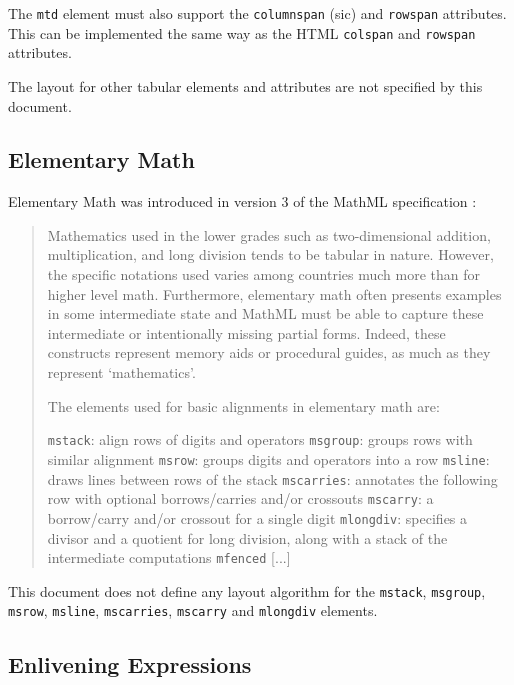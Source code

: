 The {\tt mtd} element must also support the {\tt columnspan} (sic) and
{\tt rowspan} attributes. This can be implemented the same way as
the HTML {\tt colspan} and {\tt rowspan} attributes.

The layout for other tabular elements and attributes are not specified by this
document.

\subsection{Elementary Math}

Elementary Math was introduced in version 3 of the MathML specification
\cite{MathML3}:

\begin{quote}
Mathematics used in the lower grades such as two-dimensional addition,
multiplication, and long division tends to be tabular in nature. However, the
specific notations used varies among countries much more than for higher level
math. Furthermore, elementary math often presents examples in some intermediate
state and MathML must be able to capture these intermediate or intentionally
missing partial forms. Indeed, these constructs represent memory aids or
procedural guides, as much as they represent ‘mathematics’.

The elements used for basic alignments in elementary math are:

{\tt mstack}: align rows of digits and operators
{\tt msgroup}: groups rows with similar alignment
{\tt msrow}: groups digits and operators into a row
{\tt msline}: draws lines between rows of the stack
{\tt mscarries}: annotates the following row with optional borrows/carries
and/or crossouts
{\tt mscarry}: a borrow/carry and/or crossout for a single digit
{\tt mlongdiv}: specifies a divisor and a quotient for long division, along
with a stack of the intermediate computations
{\tt mfenced}
[...]
\end{quote}

This document does not define any layout algorithm for the {\tt mstack},
{\tt msgroup}, {\tt msrow}, {\tt msline}, {\tt mscarries}, {\tt mscarry} and
{\tt mlongdiv} elements.

\subsection{Enlivening Expressions}\label{maction}

